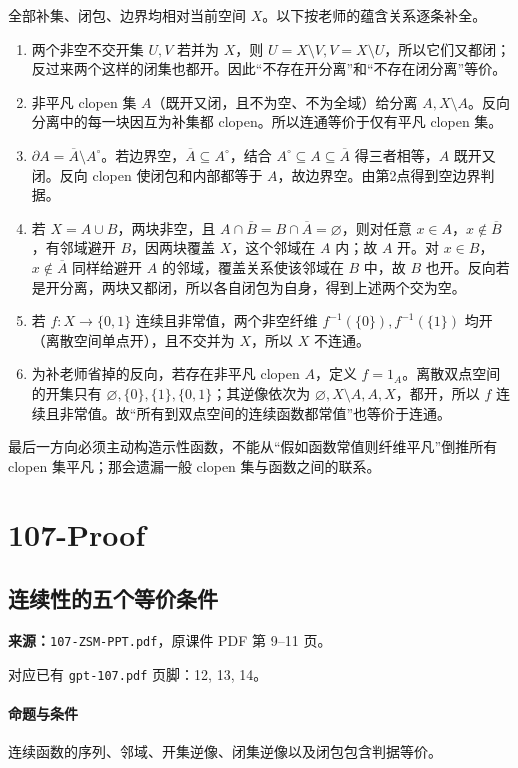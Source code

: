 全部补集、闭包、边界均相对当前空间 $X$。以下按老师的蕴含关系逐条补全。
\begin{enumerate}
\item 两个非空不交开集 $U,V$ 若并为 $X$，则 $U=X\setminus V,V=X\setminus U$，所以它们又都闭；反过来两个这样的闭集也都开。因此“不存在开分离”和“不存在闭分离”等价。
\item 非平凡 clopen 集 $A$（既开又闭，且不为空、不为全域）给分离 $A,X\setminus A$。反向分离中的每一块因互为补集都 clopen。所以连通等价于仅有平凡 clopen 集。
\item $\partial A=\overline A\setminus A^\circ$。若边界空，$\overline A\subseteq A^\circ$，结合 $A^\circ\subseteq A\subseteq\overline A$ 得三者相等，$A$ 既开又闭。反向 clopen 使闭包和内部都等于 $A$，故边界空。由第2点得到空边界判据。
\item 若 $X=A\cup B$，两块非空，且 $A\cap\overline B=B\cap\overline A=\varnothing$，则对任意 $x\in A$，$x\notin\overline B$，有邻域避开 $B$，因两块覆盖 $X$，这个邻域在 $A$ 内；故 $A$ 开。对 $x\in B$，$x\notin\overline A$ 同样给避开 $A$ 的邻域，覆盖关系使该邻域在 $B$ 中，故 $B$ 也开。反向若是开分离，两块又都闭，所以各自闭包为自身，得到上述两个交为空。
\item 若 $f:X\to\{0,1\}$ 连续且非常值，两个非空纤维 $f^{-1}(\{0\}),f^{-1}(\{1\})$ 均开（离散空间单点开），且不交并为 $X$，所以 $X$ 不连通。
\item 为补老师省掉的反向，若存在非平凡 clopen $A$，定义 $f=1_A$。离散双点空间的开集只有 $\varnothing,\{0\},\{1\},\{0,1\}$；其逆像依次为 $\varnothing,X\setminus A,A,X$，都开，所以 $f$ 连续且非常值。故“所有到双点空间的连续函数都常值”也等价于连通。
\end{enumerate}
最后一方向必须主动构造示性函数，不能从“假如函数常值则纤维平凡”倒推所有 clopen 集平凡；那会遗漏一般 clopen 集与函数之间的联系。

\clearpage\section{107-Proof}
\clearpage\subsection{连续性的五个等价条件}
\textbf{来源：}\texttt{107-ZSM-PPT.pdf}，原课件 PDF 第 9--11 页。\par
对应已有 \texttt{gpt-107.pdf} 页脚：12, 13, 14。\par
\paragraph{命题与条件}连续函数的序列、邻域、开集逆像、闭集逆像以及闭包包含判据等价。
